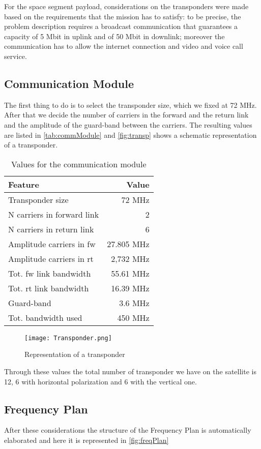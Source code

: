 For the space segment payload, considerations on the transponders were made based on the requirements that the mission has to satisfy: to be precise, the problem description requires a broadcast communication that guarantees a capacity of 5 Mbit in uplink and of 50 Mbit in downlink; moreover the communication has to allow the internet connection and video and voice call service.
\subsection{Communication Module}
The first thing to do is to select the transponder size, which we fixed at 72 MHz. After that we decide the number of carriers in the forward and the return link and the amplitude of the guard-band between the carriers. The resulting values are listed in \autoref{tab:commModule} and \autoref{fig:transp} shows a schematic representation of a transponder.

\begin{table}
\centering
\begin{tabular}{lr}
\toprule
Feature & Value\\
\midrule
Transponder size & 72 MHz\\
N carriers in forward link & 2\\
N carriers in return link & 6\\
Amplitude carriers in fw & 27.805 MHz\\
Amplitude carriers in rt & 2,732 MHz\\
Tot. fw link bandwidth & 55.61 MHz\\
Tot. rt link bandwidth & 16.39 MHz\\
Guard-band & 3.6 MHz\\
Tot. bandwidth used & 450 MHz\\
\bottomrule
\end{tabular}
\caption{Values for the communication module}
\label{tab:commModule}
\end{table}

\begin{figure}
\centering
\texttt{[image: Transponder.png]}
\caption{Representation of a transponder}
\label{fig:transp}
\end{figure}

Through these values the total number of transponder we have on the satellite is 12, 6 with horizontal polarization and 6 with the vertical one.

\subsection{Frequency Plan}
After these considerations the structure of the Frequency Plan is automatically elaborated and here it is represented in \autoref{fig:freqPlan}

